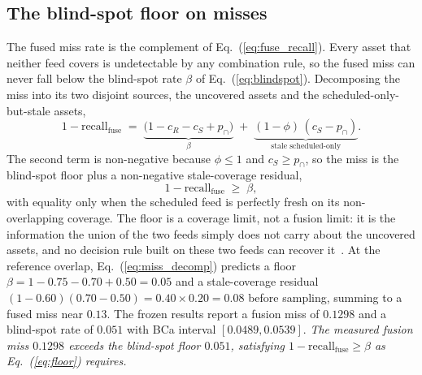 \documentclass[journal]{IEEEtran}
\begin{document}
\subsection{The blind-spot floor on misses}
The fused miss rate is the complement of Eq.~(\ref{eq:fuse_recall}). Every asset that neither feed
covers is undetectable by any combination rule, so the fused miss can never fall below the
blind-spot rate $\beta$ of Eq.~(\ref{eq:blindspot}). Decomposing the miss into its two disjoint
sources, the uncovered assets and the scheduled-only-but-stale assets,
\begin{equation}
1 - \mathrm{recall}_{\text{fuse}}
\;=\; \underbrace{\big(1 - c_R - c_S + p_{\cap}\big)}_{\beta}
\;+\; \underbrace{(1-\phi)\,(c_S - p_{\cap})}_{\text{stale scheduled-only}}.
\label{eq:miss_decomp}
\end{equation}
The second term is non-negative because $\phi \le 1$ and $c_S \ge p_{\cap}$, so the miss is the
blind-spot floor plus a non-negative stale-coverage residual,
\begin{equation}
1 - \mathrm{recall}_{\text{fuse}} \;\ge\; \beta,
\label{eq:floor}
\end{equation}
with equality only when the scheduled feed is perfectly fresh on its non-overlapping coverage. The
floor is a coverage limit, not a fusion limit: it is the information the union of the two feeds
simply does not carry about the uncovered assets, and no decision rule built on these two feeds can
recover it~\cite{cover2006elements}. At the reference overlap, Eq.~(\ref{eq:miss_decomp}) predicts a
floor $\beta = 1 - 0.75 - 0.70 + 0.50 = 0.05$ and a stale-coverage residual
$(1-0.60)(0.70-0.50) = 0.40 \times 0.20 = 0.08$ before sampling, summing to a fused miss near
$0.13$. The frozen results report a fusion miss of $0.1298$ and a blind-spot rate of $0.051$ with
BCa interval $[0.0489, 0.0539]$. \emph{The measured fusion miss $0.1298$ exceeds the blind-spot
floor $0.051$, satisfying $1 - \mathrm{recall}_{\text{fuse}} \ge \beta$ as Eq.~(\ref{eq:floor})
requires.}
\end{document}
